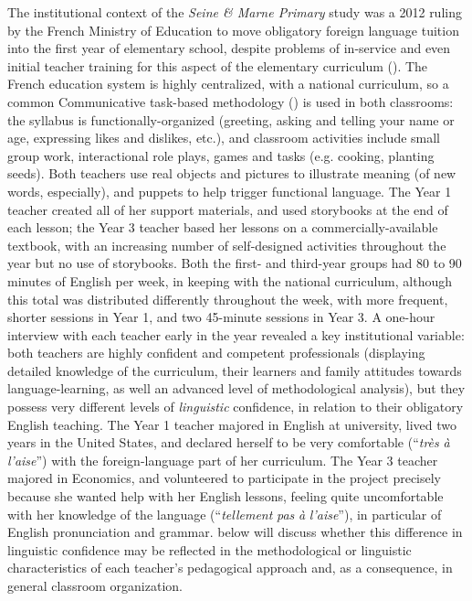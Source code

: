 \documentclass[output=paper,colorlinks,citecolor=brown,modfonts,nonflat]{../langscibook}
\begin{document}
The institutional context of the \textit{Seine \& Marne Primary} study was a 2012 ruling by the French Ministry of Education to move obligatory foreign language tuition into the first year of elementary school, despite problems of in-service and even initial teacher training for this aspect of the elementary curriculum (\citealt{YoungMary2010,Mary2014}). The French education system is highly centralized, with a national curriculum, so a common Communicative task-based methodology (\citealt{CouncilofEurope2001}) is used in both classrooms: the syllabus is functionally-organized (greeting, asking and telling your name or age, expressing likes and dislikes, etc.), and classroom activities include small group work, interactional role plays, games and tasks (e.g. cooking, planting seeds). Both teachers use real objects and pictures to illustrate meaning (of new words, especially), and puppets to help trigger functional language. The Year 1 teacher created all of her support materials, and used storybooks at the end of each lesson; the Year 3 teacher based her lessons on a commercially-available textbook, with an increasing number of self-designed activities throughout the year but no use of storybooks. Both the first- and third-year groups had 80 to 90 minutes of English per week, in keeping with the national curriculum, although this total was distributed differently throughout the week, with more frequent, shorter sessions in Year 1, and two 45-minute sessions in Year 3. A one-hour interview with each teacher early in the year revealed a key institutional variable: both teachers are highly confident and competent professionals (displaying detailed knowledge of the curriculum, their learners and family attitudes towards language-learning, as well an advanced level of methodological analysis), but they possess very different levels of \textit{linguistic} confidence, in relation to their obligatory English teaching. The Year 1 teacher majored in English at university, lived two years in the United States, and declared herself to be very comfortable (“\textit{très} \textit{à} \textit{l’aise}”) with the foreign-language part of her curriculum. The Year 3 teacher majored in Economics, and volunteered to participate in the project precisely because she wanted help with her English lessons, feeling quite uncomfortable with her knowledge of the language (“\textit{tellement} \textit{pas} \textit{à} \textit{l’aise}”), in particular of English pronunciation and grammar.  below will discuss whether this difference in linguistic confidence may be reflected in the methodological or linguistic characteristics of each teacher’s pedagogical approach and, as a consequence, in general classroom organization.
\end{document}
